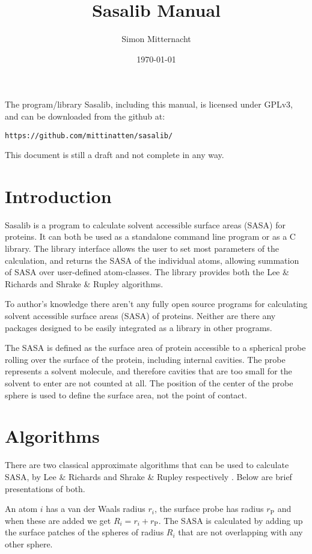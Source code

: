 \documentclass[a4paper,11pt]{article}
\author{Simon Mitternacht}
\date{\today}
\title{Sasalib Manual}
\begin{document}
\maketitle
\noindent
The program/library Sasalib, including this manual, is licensed under
GPLv3, and can be downloaded from the github at: 
\begin{center}
\texttt{https://github.com/mittinatten/sasalib/}
\end{center}

This document is still a draft and not complete in any way.

\newpage
\section{Introduction}

Sasalib is a program to calculate solvent accessible surface areas
(SASA) for proteins. It can both be used as a standalone command line
program or as a C library. The library interface allows the user to
set most parameters of the calculation, and returns the SASA of the
individual atoms, allowing summation of SASA over user-defined
atom-classes. The library provides both the Lee \& Richards
\cite{LnR} and Shrake \& Rupley \cite{SnR} algorithms.

To author's knowledge there aren't any fully open source programs for
calculating solvent accessible surface areas (SASA) of
proteins. Neither are there any packages designed to be easily
integrated as a library in other programs. 

The SASA is defined as the surface area of protein accessible to a
spherical probe rolling over the surface of the protein, including
internal cavities. The probe represents a solvent molecule, and
therefore cavities that are too small for the solvent to enter are not
counted at all. The position of the center of the probe sphere is used
to define the surface area, not the point of contact.

\section{Algorithms}

There are two classical approximate algorithms that can be used to
calculate SASA, by Lee \& Richards \cite{LnR} and Shrake \& Rupley
respectively \cite{SnR}. Below are brief presentations of both. 

An atom $i$ has a van der Waals radius $r_i$, the surface probe has
radius $r_\text{P}$ and when these are added we get $R_i = r_i +
r_\text{P}$. The SASA is calculated by adding up the surface patches
of the spheres of radius $R_i$ that are not overlapping with any other
sphere.
\end{document}
